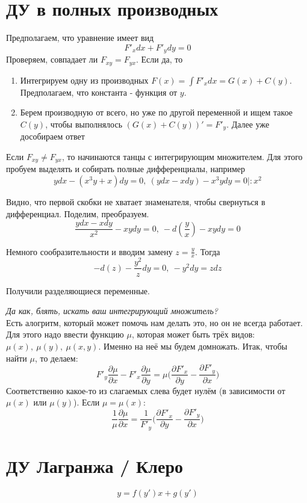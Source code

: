 \documentclass[11pt]{article}
\begin{document}
	\section{ДУ в полных производных}
	Предполагаем, что уравнение имеет вид
	$$F'_x dx + F'_y dy = 0$$
	Проверяем, совпадает ли $F_{xy} = F_{yx}$. Если да, то
	\begin{enumerate}
		\item Интегрируем одну из производных 
		$F(x) = \int F'_x dx = G(x) + C(y)$. Предполагаем, что константа - функция от $y$.
		\item Берем производную от всего, но уже по другой переменной и ищем такое $C(y)$, чтобы выполнялось $(G(x) + C(y))' = F'_y$. Далее уже дособираем ответ
	\end{enumerate}

	Если $F_{xy} \neq F_{yx}$, то начинаются танцы с интегрирующим множителем. Для этого пробуем выделять и собирать полные дифференциалы, например
	$$ydx - (x^3 y+x)dy = 0,\ (ydx - xdy) - x^3 ydy = 0 |: x^2$$
	
	Видно, что первой скобки не хватает знаменателя, чтобы свернуться в дифференциал. Поделим, преобразуем.
	$$\frac{ydx - xdy}{x^2} - xy dy = 0,\ -d(\frac{y}{x}) - xy dy = 0$$
	
	Немного сообразительности и вводим замену $z = \frac{y}{x}$. Тогда 
	$$-d(z) - \frac{y^2}{z} dy = 0,\ -y^2 dy = z dz$$
	
	Получили разделяющиеся переменные.

	\textit{Да как, блять, искать ваш интегрирующий множитель?} \\
	Есть алогритм, который может помочь нам делать это, но он не всегда работает. Для этого надо ввести функцию
	$\mu$, которая может быть трёх видов: $\mu(x), \ \mu(y), \ \mu(x, y)$. Именно на неё мы будем домножать. Итак, чтобы найти $\mu$, то делаем:
	$$F'_y \frac{\partial \mu}{\partial x} - F'_x \frac{\partial \mu}{\partial y} = \mu \bigg(\frac{\partial F'_x}{\partial y} - \frac{\partial F'_y}{\partial x}\bigg)$$
	Соответственно какое-то из слагаемых слева будет нулём (в зависимости от $\mu(x)$ или $\mu(y)$). Если $\mu = \mu(x)$:
	$$\frac{1}{\mu}\frac{\partial \mu}{\partial x} = \frac{1}{F'_y} \bigg(\frac{\partial F'_x}{\partial y} - \frac{\partial F'_y}{\partial x}\bigg)$$


	\section{ДУ Лагранжа / Клеро}
	$$y = f(y') x + g(y')$$
	
\end{document}
